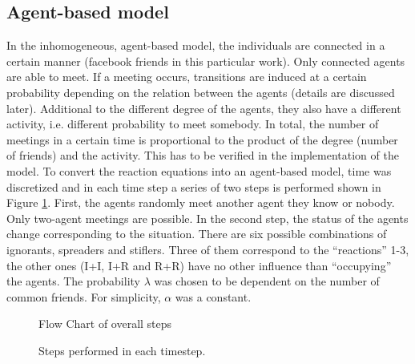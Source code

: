 \subsection{Agent-based model}

In the inhomogeneous, agent-based model, the individuals are connected in a certain manner (facebook friends in this particular work). Only connected agents are able to meet. If a meeting occurs, transitions are induced at a certain probability depending on the relation between the agents (details are discussed later). Additional to the different degree of the agents, they also have a different activity, i.e. different probability to meet somebody. In total, the number of meetings in a certain time is proportional to the product of the degree (number of friends) and the activity. This has to be verified in the implementation of the model.
\newline
\newline
To convert the reaction equations into an agent-based model, time was discretized
and in each time step a series of two steps is performed shown in Figure \ref{steps}. First, the agents randomly meet another agent they know or nobody. Only two-agent meetings are possible. In the second step, the status of the agents change corresponding to the situation. There are six possible combinations of ignorants, spreaders and stiflers. Three of them correspond to the ``reactions'' 1-3, the other ones (I+I, I+R and R+R) have no other influence than ``occupying'' the agents. The probability $\lambda$ was chosen to be dependent on the number of common friends. For simplicity, $\alpha$ was a constant.


\begin{figure}
\begin{center}
Flow Chart of overall steps
\caption{Steps performed in each timestep.}
\label{steps}
\end{center}
\end{figure}









